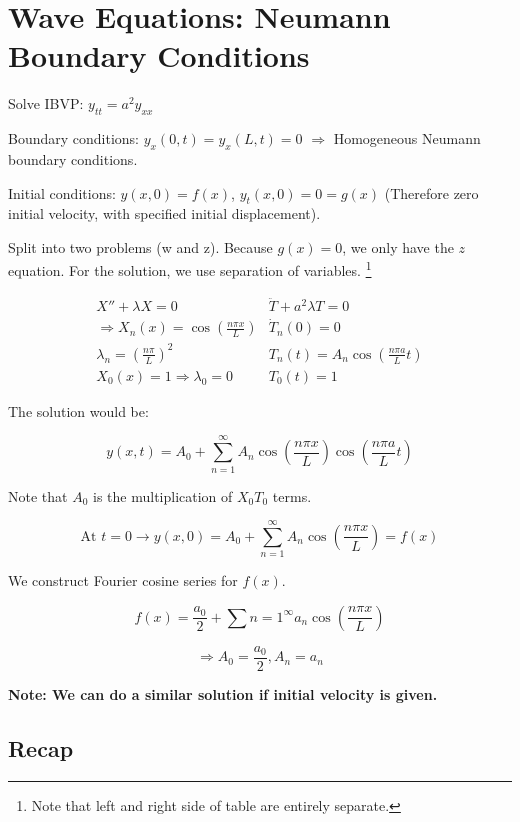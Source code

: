 \graphicspath{{./Lecture12/}}

\section{Wave Equations: Neumann Boundary Conditions}

Solve IBVP: $y_{tt} = a^2 y_{xx}$

Boundary conditions: $y_x(0,t) = y_x (L,t) = 0$ $\Rightarrow$ Homogeneous Neumann boundary conditions. 

\hfill

Initial conditions: $y(x,0) = f(x)$, $y_t(x,0) = 0 = g(x)$ (Therefore zero initial velocity, with specified initial displacement). 

Split into two problems (w and z). Because $g(x) = 0$, we only have the $z$ equation. For the solution, we use separation of variables. \footnote{Note that left and right side of table are entirely separate. }



$$\begin{array}{l|r}
     X'' + \lambda X = 0 & \ddot T + a^2 \lambda T = 0\\
     \Rightarrow X_n(x) = \cos \left( \frac{n \pi x}{L} \right) & \dot{T}_n (0) = 0 \\
     \lambda_n = \left( \frac{n \pi}{L} \right)^2 & T_n(t) = A_n \cos \left( \frac{n \pi a}{L}  t \right)\\
     X_0(x) = 1 \Rightarrow \lambda_0 = 0 & T_0(t) = 1 
\end{array}$$

The solution would be:

$$y(x,t) = A_0 + \sum_{n = 1}^\infty A_n \cos \left( \frac{n \pi x}{L}  \right) \cos \left( \frac{n \pi a}{L}  t \right)$$

Note that $A_0$ is the multiplication of $X_0 T_0$ terms.

$$\text{At } t = 0 \longrightarrow y(x,0) = A_0 + \sum_{n = 1}^\infty A_n \cos \left( \frac{n \pi x}{L}  \right) = f(x)$$

We construct Fourier cosine series for $f(x)$. 

$$f(x) = \frac{a_0}{2} + \sum{n=  1}^\infty a_n \cos \left( \frac{n \pi x}{L}  \right)$$

$$\Rightarrow A_0 = \frac{a_0}{2}, A_n = a_n$$

\textbf{Note: We can do a similar solution if initial velocity is given. }

\subsection{Recap}

